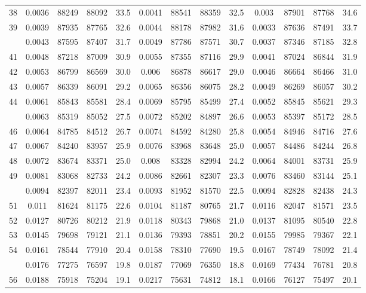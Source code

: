 \documentclass[
  14pt,
]{article}
\begin{document}
\begin{longtable}[t]{lcccccccccccc}
38 & 0.0036 & 88249 & 88092 & 33.5 & 0.0041 & 88541 & 88359 & 32.5 & 0.003 & 87901 & 87768 & 34.6\\
39 & 0.0039 & 87935 & 87765 & 32.6 & 0.0044 & 88178 & 87982 & 31.6 & 0.0033 & 87636 & 87491 & 33.7\\
\addlinespace
40 & 0.0043 & 87595 & 87407 & 31.7 & 0.0049 & 87786 & 87571 & 30.7 & 0.0037 & 87346 & 87185 & 32.8\\
41 & 0.0048 & 87218 & 87009 & 30.9 & 0.0055 & 87355 & 87116 & 29.9 & 0.0041 & 87024 & 86844 & 31.9\\
42 & 0.0053 & 86799 & 86569 & 30.0 & 0.006 & 86878 & 86617 & 29.0 & 0.0046 & 86664 & 86466 & 31.0\\
43 & 0.0057 & 86339 & 86091 & 29.2 & 0.0065 & 86356 & 86075 & 28.2 & 0.0049 & 86269 & 86057 & 30.2\\
44 & 0.0061 & 85843 & 85581 & 28.4 & 0.0069 & 85795 & 85499 & 27.4 & 0.0052 & 85845 & 85621 & 29.3\\
\addlinespace
45 & 0.0063 & 85319 & 85052 & 27.5 & 0.0072 & 85202 & 84897 & 26.6 & 0.0053 & 85397 & 85172 & 28.5\\
46 & 0.0064 & 84785 & 84512 & 26.7 & 0.0074 & 84592 & 84280 & 25.8 & 0.0054 & 84946 & 84716 & 27.6\\
47 & 0.0067 & 84240 & 83957 & 25.9 & 0.0076 & 83968 & 83648 & 25.0 & 0.0057 & 84486 & 84244 & 26.8\\
48 & 0.0072 & 83674 & 83371 & 25.0 & 0.008 & 83328 & 82994 & 24.2 & 0.0064 & 84001 & 83731 & 25.9\\
49 & 0.0081 & 83068 & 82733 & 24.2 & 0.0086 & 82661 & 82307 & 23.3 & 0.0076 & 83460 & 83144 & 25.1\\
\addlinespace
50 & 0.0094 & 82397 & 82011 & 23.4 & 0.0093 & 81952 & 81570 & 22.5 & 0.0094 & 82828 & 82438 & 24.3\\
51 & 0.011 & 81624 & 81175 & 22.6 & 0.0104 & 81187 & 80765 & 21.7 & 0.0116 & 82047 & 81571 & 23.5\\
52 & 0.0127 & 80726 & 80212 & 21.9 & 0.0118 & 80343 & 79868 & 21.0 & 0.0137 & 81095 & 80540 & 22.8\\
53 & 0.0145 & 79698 & 79121 & 21.1 & 0.0136 & 79393 & 78851 & 20.2 & 0.0155 & 79985 & 79367 & 22.1\\
54 & 0.0161 & 78544 & 77910 & 20.4 & 0.0158 & 78310 & 77690 & 19.5 & 0.0167 & 78749 & 78092 & 21.4\\
\addlinespace
55 & 0.0176 & 77275 & 76597 & 19.8 & 0.0187 & 77069 & 76350 & 18.8 & 0.0169 & 77434 & 76781 & 20.8\\
56 & 0.0188 & 75918 & 75204 & 19.1 & 0.0217 & 75631 & 74812 & 18.1 & 0.0166 & 76127 & 75497 & 20.1\\

\end{longtable}
\end{document}
